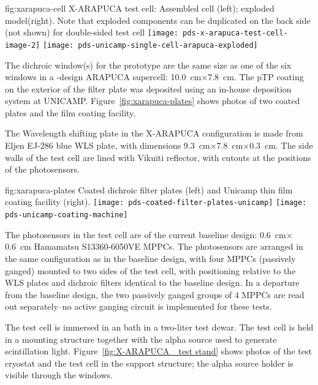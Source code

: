 \begin{dunefigure}{fig:xarapuca-cell}
{X-ARAPUCA test cell:  Assembled cell (left); exploded model(right).  Note that exploded components can be duplicated on the back side (not shown) for double-sided test cell} 
	\texttt{[image: pds-x-arapuca-test-cell-image-2]}
	\texttt{[image: pds-unicamp-single-cell-arapuca-exploded]}
\end{dunefigure}

The dichroic window(s) for the prototype are the same size as one of the six windows in a -design ARAPUCA supercell: \SI{10.0}{cm}$\times$\SI{7.8}{cm}.  The pTP coating on the exterior of the filter plate was deposited using an in-house deposition system at UNICAMP. Figure~\ref{fig:xarapuca-plates} shows photos of two coated plates and the film coating facility. 

The Wavelength shifting plate in the X-ARAPUCA configuration is made from Eljen EJ-286 blue WLS plate, with dimensions \SI{9.3}{cm}$\times$\SI{7.8}{cm}$\times$\SI{0.3}{cm}.  The side walls of the test cell are lined with Vikuiti reflector, with cutouts at the positions of the photosensors.

\begin{dunefigure}{fig:xarapuca-plates}
{Coated dichroic filter plates (left) and Unicamp thin film coating facility (right).} 
	\texttt{[image: pds-coated-filter-plates-unicamp]}\quad
	\texttt{[image: pds-unicamp-coating-machine]}
\end{dunefigure}

The photosensors in the test cell are of the current baseline design:  \SI{0.6}{cm}$\times$\SI{0.6}{cm} Hamamatsu S13360-6050VE MPPCs.  The photosensors are arranged in the same configuration as in the baseline design, with four MPPCs (passively ganged) mounted to two sides of the test cell, with positioning relative to the WLS plates and dichroic filters identical to the baseline design.  In a departure from the baseline design, the two passively ganged groups of 4 MPPCs are read out separately--no active ganging circuit is implemented for these tests.

The test cell is immersed in an  bath in a two-liter test dewar.  The test cell is held in a mounting structure together with the alpha source used to generate scintillation light. Figure~\ref{fig:X-ARAPUCA _test stand} shows photos of the test cryostat and the test cell in the support structure; the alpha source holder is visible through the windows. 

